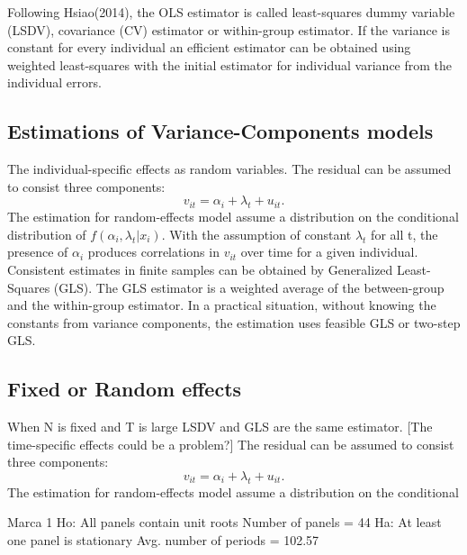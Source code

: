 \documentclass[]{article}
\begin{document}
Following Hsiao(2014), the OLS estimator is called least-squares dummy variable (LSDV), covariance (CV) estimator or within-group estimator.
If the variance is constant for every individual an efficient estimator can be obtained using weighted least-squares with the initial estimator for individual variance from the individual errors. 
 
\subsection{Estimations of Variance-Components models}
The individual-specific effects as random variables.
The residual can be assumed to consist three components:
\begin{equation*}
v_{it} = \alpha_{i} + \lambda_{t} + u_{it}.
\end{equation*}
The estimation for random-effects model assume a distribution on the conditional distribution of $f(\alpha_{i},\lambda_{t}|x_i)$.
With the assumption of constant $\lambda_{t}$ for all t, the presence of $\alpha_{i}$ produces correlations in $v_{it} $ over time for a given individual.
Consistent estimates in finite samples can be obtained by Generalized Least-Squares (GLS).
The GLS estimator is a weighted average of the between-group and the within-group estimator.
In a practical situation, without knowing the constants from variance components, the estimation uses feasible GLS or two-step GLS.

\subsection{Fixed or Random effects}
When N is fixed and T is large LSDV and GLS are the same estimator. 
[The time-specific effects could be a problem?]
The residual can be assumed to consist three components:
\begin{equation*}
v_{it} = \alpha_{i} + \lambda_{t} + u_{it}.
\end{equation*}
The estimation for random-effects model assume a distribution on the conditional 

Marca 1
Ho: All panels contain unit roots           Number of panels       =     44
Ha: At least one panel is stationary        Avg. number of periods = 102.57
\end{document}
